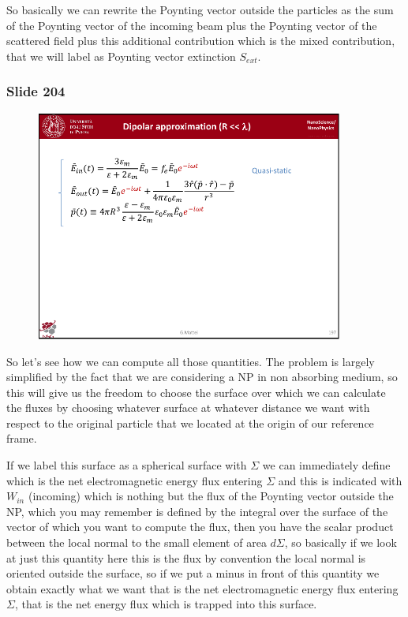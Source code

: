 \documentclass[../main/main.tex]{subfiles}
\begin{document}
So basically we can rewrite the Poynting vector outside the particles as the sum of the Poynting vector of the incoming beam plus the Poynting vector of the scattered field plus this additional contribution which is the mixed contribution, that we will label as Poynting vector extinction $S_{ext}$.



\newpage

\subsubsection{Slide 204}

\begin{figure}[h!]
\centering
\includegraphics[page=8,width=0.9\textwidth]{../lessons/pdf_file/12_lesson.pdf}
\end{figure}


So let's see how we can compute all those quantities. The problem is largely simplified by the fact that we are considering a NP in non absorbing medium, so this will give us the freedom to choose the surface over which we can calculate the fluxes by choosing whatever surface at whatever distance we want with respect to the original particle that we located at the origin of our reference frame. 

If we label this surface as a spherical surface with $\Sigma$ we can immediately define which is the net electromagnetic energy flux entering $\Sigma$ and this is indicated with $W_{in}$ (incoming) which is nothing but the flux of the Poynting vector outside the NP, which you may remember is defined by the integral over the surface of the vector of which you want to compute the flux, then you have the scalar product between the local normal to the small element of area $d\Sigma$, so basically if we look at just this quantity here this is the flux by convention the local normal is oriented outside the surface, so if we put a minus in front of this quantity we obtain exactly what we want that is the net electromagnetic energy flux entering $\Sigma$, that is the net energy flux which is trapped into this surface.
\end{document}
